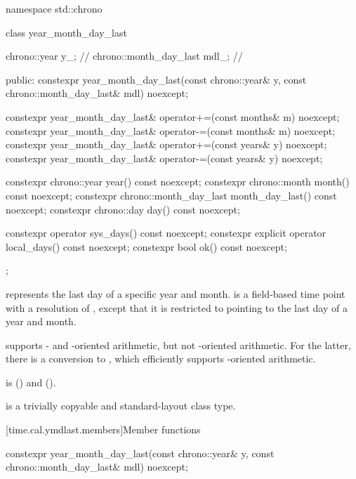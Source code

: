 \begin{codeblock}
namespace std::chrono {
  class year_month_day_last {
    chrono::year           y_;          // \expos
    chrono::month_day_last mdl_;        // \expos

  public:
    constexpr year_month_day_last(const chrono::year& y,
                                  const chrono::month_day_last& mdl) noexcept;

    constexpr year_month_day_last& operator+=(const months& m) noexcept;
    constexpr year_month_day_last& operator-=(const months& m) noexcept;
    constexpr year_month_day_last& operator+=(const years& y)  noexcept;
    constexpr year_month_day_last& operator-=(const years& y)  noexcept;

    constexpr chrono::year           year()           const noexcept;
    constexpr chrono::month          month()          const noexcept;
    constexpr chrono::month_day_last month_day_last() const noexcept;
    constexpr chrono::day            day()            const noexcept;

    constexpr          operator sys_days()   const noexcept;
    constexpr explicit operator local_days() const noexcept;
    constexpr bool ok() const noexcept;
  };
}
\end{codeblock}

\pnum
{} represents the last day of a specific year and month.
 is a field-based time point with a resolution of ,
except that it is restricted to pointing to the last day of a year and month.
\begin{note}
 supports - and -oriented arithmetic,
but not -oriented arithmetic.
For the latter, there is a conversion to ,
which efficiently supports -oriented arithmetic.
\end{note}
 is  ()
and  ().

\pnum
{} is a trivially copyable and standard-layout class type.

[time.cal.ymdlast.members]{Member functions}

%
\begin{itemdecl}
constexpr year_month_day_last(const chrono::year& y,
                              const chrono::month_day_last& mdl) noexcept;
\end{itemdecl}

